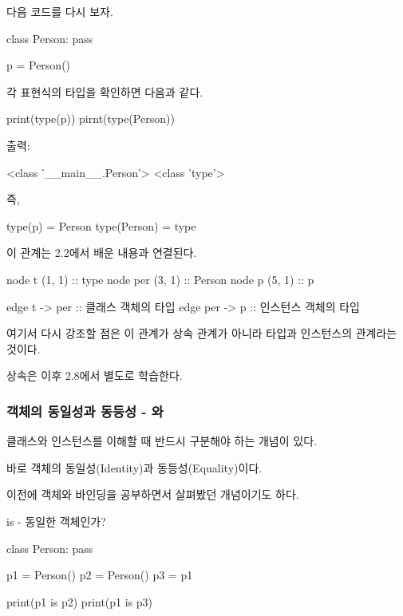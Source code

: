 다음 코드를 다시 보자.

\begin{dhkcode}
class Person:
    pass

p = Person()
\end{dhkcode}

각 표현식의 타입을 확인하면 다음과 같다.

\begin{dhkcode}
print(type(p))
pirnt(type(Person))
\end{dhkcode}

출력:

\begin{dhkzsh}
<class '__main__.Person'>
<class 'type'>
\end{dhkzsh}

즉,

\begin{dhkzsh}
type(p) = Person
type(Person) = type
\end{dhkzsh}


이 관계는 2.2에서 배운 내용과 연결된다.

\begin{dhkdiagram}[in=6]
node t (1, 1) :: type
node per (3, 1) :: Person
node p (5, 1) :: p

edge t -> per :: 클래스 객체의 타입
edge per -> p :: 인스턴스 객체의 타입
\end{dhkdiagram}

여기서 다시 강조할 점은 이 관계가 상속 관계가 아니라 타입과 인스턴스의 관계라는 것이다.

상속은 이후 2.8에서 별도로 학습한다.

\subsubsection{객체의 동일성과 동등성 - 와 \zsh{==}}

클래스와 인스턴스를 이해할 때 반드시 구분해야 하는 개념이 있다.

바로 객체의 동일성(Identity)과 동등성(Equality)이다.

이전에 객체와 바인딩을 공부하면서 살펴봤던 개념이기도 하다.

\begin{dhknote}
\begin{dhksmry}[centered]
is - 동일한 객체인가?
\end{dhksmry}
\end{dhknote}

\begin{dhkcode}
class Person:
    pass

p1 = Person()
p2 = Person()
p3 = p1

print(p1 is p2)
print(p1 is p3)
\end{dhkcode}

